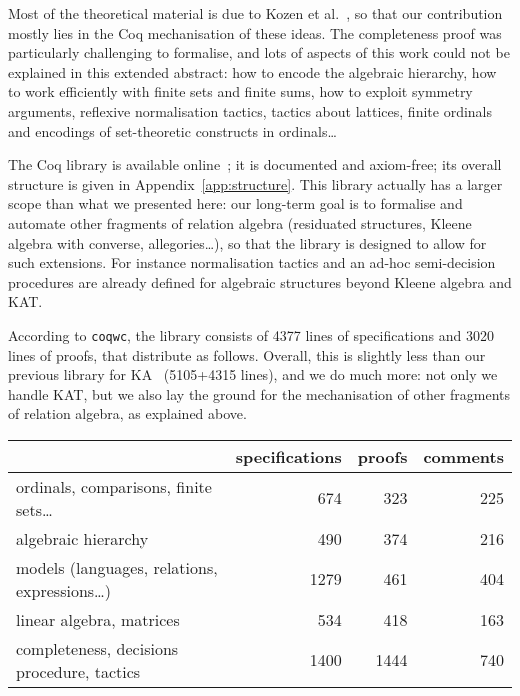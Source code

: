 \documentclass[a4paper]{llncs}
\begin{document}
Most of the theoretical material is due to Kozen et
al.~\cite{kozen94:ka:completeness,kozens96:kat:completeness:decidability,kozen:97:kat,kozen98:ka:typed,kozenp00:kat:compiler:opts,kozen00:kat:hoare,angusk01:kat:schemato,hardink02:kat:hypotheses,kozen08:kat:coalgebra},
so that our contribution mostly lies in the Coq mechanisation of these
ideas.
The completeness proof was particularly challenging to formalise, and
lots of aspects of this work could not be explained in this extended
abstract: how to encode the algebraic hierarchy, how to work
efficiently with finite sets and finite sums, how to exploit symmetry
arguments, reflexive normalisation tactics, tactics about lattices,
finite ordinals and encodings of set-theoretic constructs in
ordinals\dots



The Coq library is available online~\cite{pous:coq:ra}; it is
documented and axiom-free; its overall structure is given in
Appendix~\ref{app:structure}. This library actually has a larger scope
than what we presented here: our long-term goal is to formalise and
automate other fragments of relation algebra (residuated structures,
Kleene algebra with converse, allegories\dots), so that the library is
designed to allow for such extensions. For instance normalisation
tactics and an ad-hoc semi-decision procedures are already defined for
algebraic structures beyond Kleene algebra and KAT.

According to \texttt{coqwc}, the library consists of 4377 lines of
specifications and 3020 lines of proofs, that distribute as follows.
Overall, this is slightly less than our previous library for
KA~\cite{bp:itp10:kacoq} (5105+4315 lines), and we do much more: not
only we handle KAT, but we also lay the ground for the mechanisation
of other fragments of relation algebra, as explained above.

\begin{center}
  \begin{tabular}{|l|r|r|r|}
    \hline
    &specifications&proofs&comments\\
    \hline
    ordinals, comparisons, finite sets\dots&674&323&225\\  
    algebraic hierarchy&490&374&216\\
    models (languages, relations, expressions\dots)&1279&461&404\\
    linear algebra, matrices&534&418&163\\
    completeness, decisions procedure, tactics&1400&1444&740\\
    \hline
  \end{tabular}
\end{center}
\end{document}
